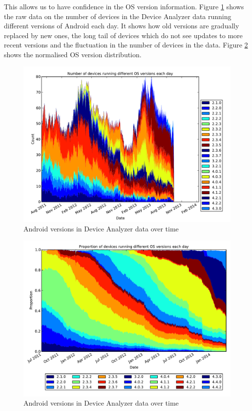 \documentclass[conference,a4paper,twoside]{IEEEtran}
\begin{document}
This allows us to have confidence in the OS version information.
Figure \ref{fig:os} shows the raw data on the number of devices in the Device Analyzer data running different versions of Android each day.
It shows how old versions are gradually replaced by new ones, the long tail of devices which do not see updates to more recent versions and the fluctuation in the number of devices in the data.
Figure \ref{fig:norm_os} shows the normalised OS version distribution.
\begin{figure}
 \centering
 \includegraphics[width=\columnwidth]{figures/os}
 \caption{Android versions in Device Analyzer data over time}
 \label{fig:os}
\end{figure}
\begin{figure}
 \centering
 \includegraphics[width=\columnwidth]{figures/da_norm_os}
 \caption{Android versions in Device Analyzer data over time}
 \label{fig:norm_os}
\end{figure}
\end{document}
